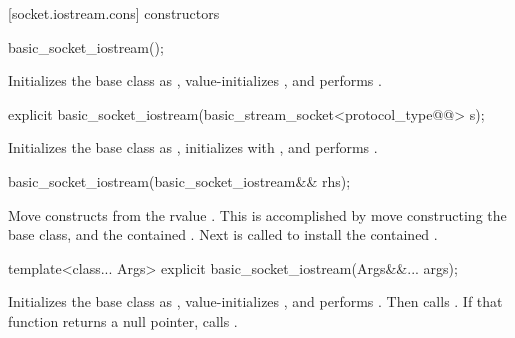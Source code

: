 [socket.iostream.cons]{ constructors}

\begin{itemdecl}
basic_socket_iostream();
\end{itemdecl}

\begin{itemdescr}
\pnum
\effects Initializes the base class as , value-initializes , and performs .

\addedpnum
{}
\end{itemdescr}

\begin{itemdecl}
explicit basic_socket_iostream(basic_stream_socket<protocol_type@@> s);
\end{itemdecl}

\begin{itemdescr}
\pnum
\effects Initializes the base class as , initializes  with , and performs .
\end{itemdescr}

\begin{itemdecl}
basic_socket_iostream(basic_socket_iostream&& rhs);
\end{itemdecl}

\begin{itemdescr}
\pnum
\effects Move constructs from the rvalue . This is accomplished by move constructing the base class, and the contained . Next  is called to install the contained .
\end{itemdescr}

\begin{itemdecl}
template<class... Args>
  explicit basic_socket_iostream(Args&&... args);
\end{itemdecl}


\begin{itemdescr}
\pnum
\effects Initializes the base class as , value-initializes , and performs . Then calls . If that function returns a null pointer, calls .
\end{itemdescr}

